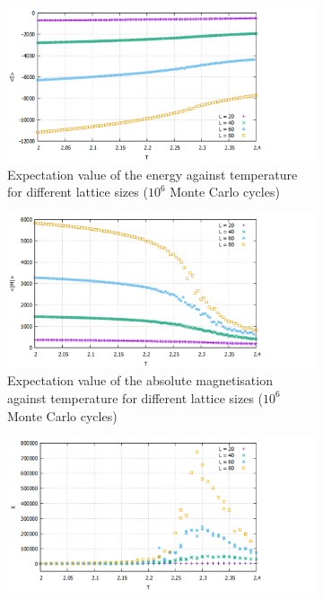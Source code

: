 \documentclass[10pt,a4paper]{article}
\begin{document}
\begin{figure}[h]
\centering
\begin{subfigure}{0.45\textwidth}
	\includegraphics[width =\textwidth]{E_all.png}
	\centering
	\caption{Expectation value of the energy against temperature for different lattice sizes ($10^6$ Monte Carlo cycles)}
	\label{e_all}
\end{subfigure}
\begin{subfigure}{0.45\textwidth}
	\includegraphics[width=\textwidth]{absm_all.png}
	\centering
	\caption{Expectation value of the absolute magnetisation against temperature for different lattice sizes ($10^6$ Monte Carlo cycles)}
	\label{absm_all}
\end{subfigure}
\begin{subfigure}{0.45\textwidth}
	\includegraphics[width=\textwidth]{sus_all.png}

\end{subfigure}
\end{figure}
\end{document}
